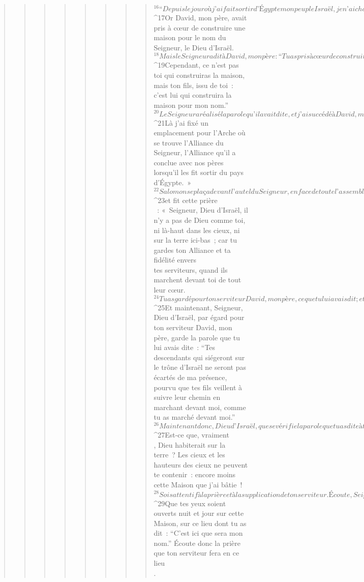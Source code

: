 \begin{verse}
\begin{verse}
\begin{verse}
\begin{verse}
\begin{verse}
\begin{verse}
\begin{verse}
\begin{verse}
${}^{16}“Depuis le jour où j’ai fait sortir d’Égypte mon peuple Israël, je n’ai choisi aucune ville entre toutes les tribus d’Israël pour y construire une maison où serait mon nom. Mais j’ai choisi David pour qu’il soit le chef de mon peuple Israël.” 
${}^{17}Or David, mon père, avait pris à cœur de construire une maison pour le nom du Seigneur, le Dieu d’Israël. 
${}^{18}Mais le Seigneur a dit à David, mon père : “Tu as pris à cœur de construire une maison pour mon nom, et tu as bien fait de prendre cela à cœur. 
${}^{19}Cependant, ce n’est pas toi qui construiras la maison, mais ton fils, issu de toi : c’est lui qui construira la maison pour mon nom.” 
${}^{20}Le Seigneur a réalisé la parole qu’il avait dite, et j’ai succédé à David, mon père, je me suis assis sur le trône d’Israël, comme l’avait dit le Seigneur, et j’ai construit la maison pour le nom du Seigneur, le Dieu d’Israël. 
${}^{21}Là j’ai fixé un emplacement pour l’Arche où se trouve l’Alliance du Seigneur, l’Alliance qu’il a conclue avec nos pères lorsqu’il les fit sortir du pays d’Égypte. »
${}^{22}Salomon se plaça devant l’autel du Seigneur, en face de toute l’assemblée d’Israël ; il étendit les mains vers le ciel 
${}^{23}et fit cette prière\\ : « Seigneur, Dieu d’Israël, il n’y a pas de Dieu comme toi, ni là-haut dans les cieux, ni sur la terre ici-bas ; car tu gardes ton Alliance et ta fidélité envers\\tes serviteurs, quand ils marchent devant toi de tout leur cœur. 
${}^{24}Tu as gardé pour ton serviteur David, mon père, ce que tu lui avais dit ; et ce que tu lui avais dit de ta bouche, aujourd’hui tu l’as accompli de ta main. 
${}^{25}Et maintenant, Seigneur, Dieu d’Israël, par égard pour ton serviteur David, mon père, garde la parole que tu lui avais dite : “Tes descendants qui siégeront sur le trône d’Israël ne seront pas écartés de ma présence, pourvu que tes fils veillent à suivre leur chemin en marchant devant moi, comme tu as marché devant moi.” 
${}^{26}Maintenant donc, Dieu d’Israël, que se vérifie la parole que tu as dite à ton serviteur David, mon père ! 
${}^{27}Est-ce que, vraiment\\, Dieu habiterait sur la terre ? Les cieux et les hauteurs des cieux ne peuvent te contenir : encore moins cette Maison que j’ai bâtie ! 
${}^{28}Sois attentif à la prière et à la supplication de ton serviteur. Écoute, Seigneur mon Dieu, la prière et le cri qu’il lance aujourd’hui vers toi. 
${}^{29}Que tes yeux soient ouverts nuit et jour sur cette Maison, sur ce lieu dont tu as dit : “C’est ici que sera mon nom.” Écoute donc la prière que ton serviteur fera en ce lieu\\. 

\end{verse}
\end{verse}
\end{verse}
\end{verse}
\end{verse}
\end{verse}
\end{verse}
\end{verse}
